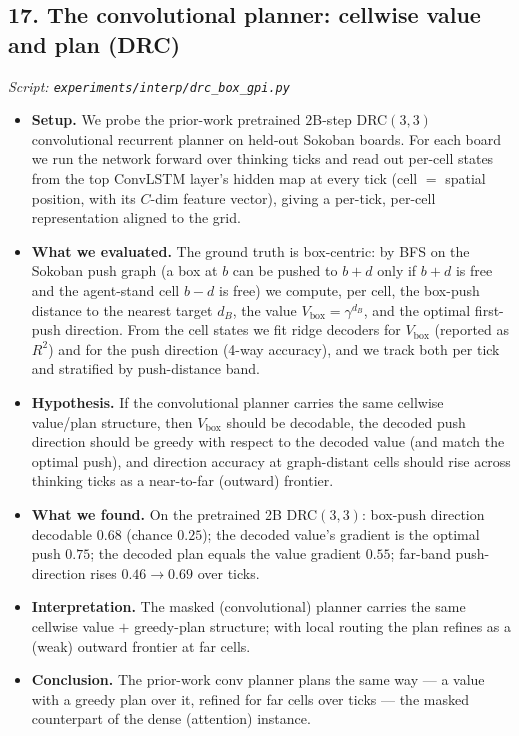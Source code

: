 \documentclass[11pt]{article}
\begin{document}
\subsection*{17. The convolutional planner: cellwise value and plan (DRC)}
\textit{Script: \texttt{experiments/interp/drc\_box\_gpi.py}}
\begin{itemize}
\item \textbf{Setup.} We probe the prior-work pretrained $2$B-step DRC$(3,3)$ convolutional recurrent planner on held-out Sokoban boards. For each board we run the network forward over thinking ticks and read out per-cell states from the top ConvLSTM layer's hidden map at every tick (cell $=$ spatial position, with its $C$-dim feature vector), giving a per-tick, per-cell representation aligned to the grid.
\item \textbf{What we evaluated.} The ground truth is box-centric: by BFS on the Sokoban push graph (a box at $b$ can be pushed to $b{+}d$ only if $b{+}d$ is free and the agent-stand cell $b{-}d$ is free) we compute, per cell, the box-push distance to the nearest target $d_B$, the value $V_{\mathrm{box}}=\gamma^{d_B}$, and the optimal first-push direction. From the cell states we fit ridge decoders for $V_{\mathrm{box}}$ (reported as $R^2$) and for the push direction (4-way accuracy), and we track both per tick and stratified by push-distance band.
\item \textbf{Hypothesis.} If the convolutional planner carries the same cellwise value/plan structure, then $V_{\mathrm{box}}$ should be decodable, the decoded push direction should be greedy with respect to the decoded value (and match the optimal push), and direction accuracy at graph-distant cells should rise across thinking ticks as a near-to-far (outward) frontier.
\item \textbf{What we found.} On the pretrained 2B DRC$(3,3)$: box-push direction decodable $0.68$ (chance $0.25$); the decoded value's gradient is the optimal push $0.75$; the decoded plan equals the value gradient $0.55$; far-band push-direction rises $0.46\to0.69$ over ticks.
\item \textbf{Interpretation.} The masked (convolutional) planner carries the same cellwise value $+$ greedy-plan structure; with local routing the plan refines as a (weak) outward frontier at far cells.
\item \textbf{Conclusion.} The prior-work conv planner plans the same way --- a value with a greedy plan over it, refined for far cells over ticks --- the masked counterpart of the dense (attention) instance.
\end{itemize}
\clearpage
\end{document}
